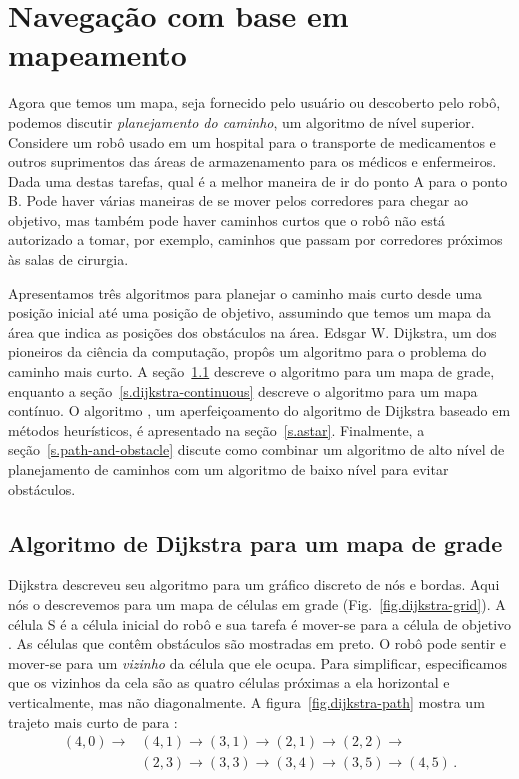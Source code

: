 
\chapter{Navegação com base em mapeamento}\label{ch.map-based}

Agora que temos um mapa, seja fornecido pelo usuário ou descoberto pelo robô, podemos discutir \emph{planejamento do caminho}, um algoritmo de nível superior. Considere um robô usado em um hospital para o transporte de medicamentos e outros suprimentos das áreas de armazenamento para os médicos e enfermeiros. Dada uma destas tarefas, qual é a melhor maneira de ir do ponto A para o ponto B. Pode haver várias maneiras de se mover pelos corredores para chegar ao objetivo, mas também pode haver caminhos curtos que o robô não está autorizado a tomar, por exemplo, caminhos que passam por corredores próximos às salas de cirurgia.

Apresentamos três algoritmos para planejar o caminho mais curto desde uma posição inicial até uma posição de objetivo, assumindo que temos um mapa da área que indica as posições dos obstáculos na área. Edsgar W. Dijkstra, um dos pioneiros da ciência da computação, propôs um algoritmo para o problema do caminho mais curto. A seção~\ref{s.dijkstra-grid} descreve o algoritmo para um mapa de grade, enquanto a seção~\ref{s.dijkstra-continuous} descreve o algoritmo para um mapa contínuo. O algoritmo \astar{}, um aperfeiçoamento do algoritmo de Dijkstra baseado em métodos heurísticos, é apresentado na seção~\ref{s.astar}. Finalmente, a seção~\ref{s.path-and-obstacle} discute como combinar um algoritmo de alto nível de planejamento de caminhos com um algoritmo de baixo nível para evitar obstáculos.

\section{Algoritmo de Dijkstra para um mapa de grade}\label{s.dijkstra-grid}

Dijkstra descreveu seu algoritmo para um gráfico discreto de nós e bordas. Aqui nós o descrevemos para um mapa de células em grade (Fig.~\ref{fig.dijkstra-grid}). A célula {S} é a célula inicial do robô e sua tarefa é mover-se para a célula de objetivo . As células que contêm obstáculos são mostradas em preto. O robô pode sentir e mover-se para um \emph{vizinho} da célula  que ele ocupa. Para simplificar, especificamos que os vizinhos da cela são as quatro células próximas a ela horizontal e verticalmente, mas não diagonalmente. A figura~\ref{fig.dijkstra-path} mostra um trajeto mais curto de  para :
\[
\begin{array}{ll}
(4,0) \rightarrow &(4,1)\rightarrow (3,1) \rightarrow (2,1) \rightarrow (2,2) \rightarrow \\
&(2,3) \rightarrow (3,3) \rightarrow (3,4) \rightarrow (3,5) \rightarrow (4,5)\,.
\end{array}
\]

